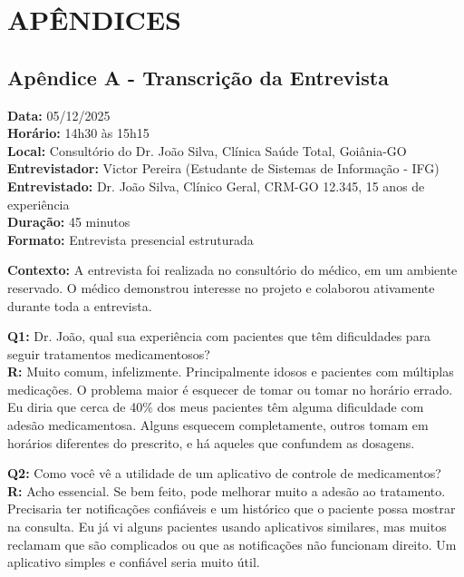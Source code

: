 \documentclass[12pt]{article}
\begin{document}
\newpage
\section{APÊNDICES}

\subsection{Apêndice A - Transcrição da Entrevista}
\label{apendice-a}

\textbf{Data:} 05/12/2025 \\
\textbf{Horário:} 14h30 às 15h15 \\
\textbf{Local:} Consultório do Dr. João Silva, Clínica Saúde Total, Goiânia-GO \\
\textbf{Entrevistador:} Victor Pereira (Estudante de Sistemas de Informação - IFG) \\
\textbf{Entrevistado:} Dr. João Silva, Clínico Geral, CRM-GO 12.345, 15 anos de experiência \\
\textbf{Duração:} 45 minutos \\
\textbf{Formato:} Entrevista presencial estruturada

\textbf{Contexto:} A entrevista foi realizada no consultório do médico, em um ambiente reservado. O médico demonstrou interesse no projeto e colaborou ativamente durante toda a entrevista.

\textbf{Q1:} Dr. João, qual sua experiência com pacientes que têm dificuldades para seguir tratamentos medicamentosos? \\
\textbf{R:} Muito comum, infelizmente. Principalmente idosos e pacientes com múltiplas medicações. O problema maior é esquecer de tomar ou tomar no horário errado. Eu diria que cerca de 40\% dos meus pacientes têm alguma dificuldade com adesão medicamentosa. Alguns esquecem completamente, outros tomam em horários diferentes do prescrito, e há aqueles que confundem as dosagens.

\textbf{Q2:} Como você vê a utilidade de um aplicativo de controle de medicamentos? \\
\textbf{R:} Acho essencial. Se bem feito, pode melhorar muito a adesão ao tratamento. Precisaria ter notificações confiáveis e um histórico que o paciente possa mostrar na consulta. Eu já vi alguns pacientes usando aplicativos similares, mas muitos reclamam que são complicados ou que as notificações não funcionam direito. Um aplicativo simples e confiável seria muito útil.
\end{document}
